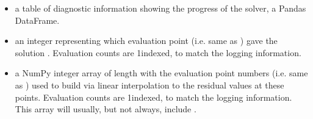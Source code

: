 \documentclass[letterpaper,10pt,english]{sphinxmanual}
\begin{document}
\begin{itemize}
\item {} 
\sphinxAtStartPar
{} \sphinxhyphen{} a table of diagnostic information showing the progress of the solver, a Pandas DataFrame.

\item {} 
\sphinxAtStartPar
{} \sphinxhyphen{} an integer representing which evaluation point (i.e. same as ) gave the solution . Evaluation counts are 1\sphinxhyphen{}indexed, to match the logging information.

\item {} 
\sphinxAtStartPar
{} \sphinxhyphen{} a NumPy integer array of length  with the evaluation point numbers (i.e. same as ) used to build  via linear interpolation to the residual values at these points. Evaluation counts are 1\sphinxhyphen{}indexed, to match the logging information. This array will usually, but not always, include .

\end{itemize}
\end{document}
